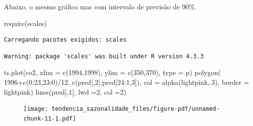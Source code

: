 \documentclass[
  letterpaper,
  DIV=11,
  numbers=noendperiod]{scrartcl}
\newenvironment{Shaded}{\begin{snugshade}}{\end{snugshade}}
\newcommand{\AttributeTok}[1]{\textcolor[rgb]{0.40,0.45,0.13}{#1}}
\newcommand{\DecValTok}[1]{\textcolor[rgb]{0.68,0.00,0.00}{#1}}
\newcommand{\FunctionTok}[1]{\textcolor[rgb]{0.28,0.35,0.67}{#1}}
\newcommand{\NormalTok}[1]{\textcolor[rgb]{0.00,0.23,0.31}{#1}}
\newcommand{\SpecialCharTok}[1]{\textcolor[rgb]{0.37,0.37,0.37}{#1}}
\newcommand{\StringTok}[1]{\textcolor[rgb]{0.13,0.47,0.30}{#1}}
\theoremstyle{plain}
\theoremstyle{plain}
\theoremstyle{definition}
\theoremstyle{definition}
\theoremstyle{remark}
\begin{document}
Abaixo, o mesmo gráfico mas com intervalo de previsão de 90\%.

\begin{Shaded}
\begin{Highlighting}[]
\FunctionTok{require}\NormalTok{(scales)}
\end{Highlighting}
\end{Shaded}

\begin{verbatim}
Carregando pacotes exigidos: scales
\end{verbatim}

\begin{verbatim}
Warning: package 'scales' was built under R version 4.3.3
\end{verbatim}

\begin{Shaded}
\begin{Highlighting}[]
\FunctionTok{ts.plot}\NormalTok{(co2, }\AttributeTok{xlim =} \FunctionTok{c}\NormalTok{(}\DecValTok{1994}\NormalTok{,}\DecValTok{1998}\NormalTok{), }\AttributeTok{ylim =} \FunctionTok{c}\NormalTok{(}\DecValTok{350}\NormalTok{,}\DecValTok{370}\NormalTok{), }\AttributeTok{type =} \StringTok{\textquotesingle{}p\textquotesingle{}}\NormalTok{)}
\FunctionTok{polygon}\NormalTok{( }\DecValTok{1996}\SpecialCharTok{+}\FunctionTok{c}\NormalTok{(}\DecValTok{0}\SpecialCharTok{:}\DecValTok{23}\NormalTok{,}\DecValTok{23}\SpecialCharTok{:}\DecValTok{0}\NormalTok{)}\SpecialCharTok{/}\DecValTok{12}\NormalTok{, }\FunctionTok{c}\NormalTok{(pred[,}\DecValTok{2}\NormalTok{],pred[}\DecValTok{24}\SpecialCharTok{:}\DecValTok{1}\NormalTok{,}\DecValTok{3}\NormalTok{]), }\AttributeTok{col =} \FunctionTok{alpha}\NormalTok{(}\StringTok{\textquotesingle{}lightpink\textquotesingle{}}\NormalTok{,.}\DecValTok{3}\NormalTok{), }\AttributeTok{border =} \StringTok{\textquotesingle{}lightpink\textquotesingle{}}\NormalTok{)}
\FunctionTok{lines}\NormalTok{(pred[,}\DecValTok{1}\NormalTok{], }\AttributeTok{lwd =}\DecValTok{2}\NormalTok{, }\AttributeTok{col =}\DecValTok{2}\NormalTok{)}
\end{Highlighting}
\end{Shaded}

\begin{figure}[H]

{\centering \texttt{[image: tendencia\_sazonalidade\_files/figure-pdf/unnamed-chunk-11-1.pdf]}

}

\end{figure}
\end{document}
